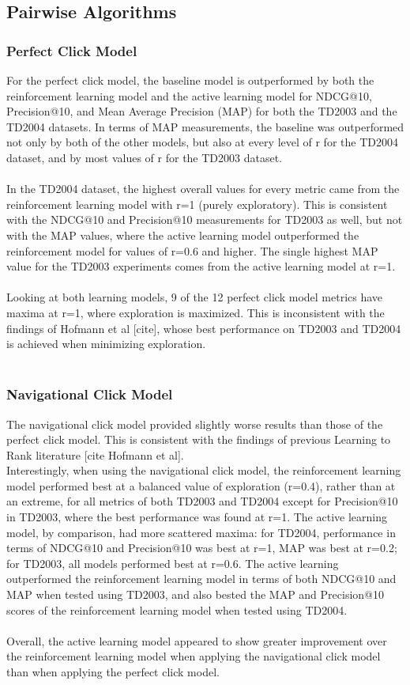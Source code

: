 \documentclass{acm_proc_article-sp}
\begin{document}
\subsection{Pairwise Algorithms}
\subsubsection{Perfect Click Model}
For the perfect click model, the baseline model is outperformed by both the reinforcement learning model and the active learning model for NDCG@10, Precision@10, and Mean Average Precision (MAP) for both the TD2003 and the TD2004 datasets.  In terms of MAP measurements, the baseline was outperformed not only by both of the other models, but also at every level of r for the TD2004 dataset, and by most values of r for the TD2003 dataset.  \\ \\
In the TD2004 dataset, the highest overall values for every metric came from the reinforcement learning model with r=1 (purely exploratory).  This is consistent with the NDCG@10 and Precision@10 measurements for TD2003 as well, but not with the MAP values, where the active learning model outperformed the reinforcement model for values of r=0.6 and higher.  The single highest MAP value for the TD2003 experiments comes from the active learning model at r=1.   \\ \\
Looking at both learning models, 9 of the 12 perfect click model metrics have maxima at r=1, where exploration is maximized.  This is inconsistent with the findings of Hofmann et al [cite], whose best performance on TD2003 and TD2004 is achieved when minimizing exploration.  \\ \\

\subsubsection{Navigational Click Model}
The navigational click model provided slightly worse results than those of the perfect click model.  This is consistent with the findings of previous Learning to Rank literature [cite Hofmann et al].\\
Interestingly, when using the navigational click model, the reinforcement learning model performed best at a balanced value of exploration (r=0.4), rather than at an extreme, for all metrics of both TD2003 and TD2004 except for Precision@10 in TD2003, where the best performance was found at r=1.  The active learning model, by comparison, had more scattered maxima:  for TD2004, performance in terms of NDCG@10 and Precision@10 was best at r=1, MAP was best at r=0.2; for TD2003, all models performed best at r=0.6.   The active learning outperformed the reinforcement learning model in terms of both NDCG@10 and MAP when tested using TD2003, and also bested the MAP and Precision@10 scores of the reinforcement learning model when tested using TD2004.  \\ \\
Overall, the active learning model appeared to show greater improvement over the reinforcement learning model when applying the navigational click model than when applying the perfect click model. 
\end{document}
